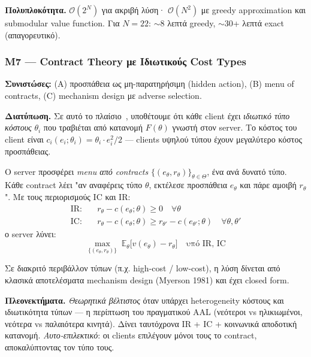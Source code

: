 \textbf{Πολυπλοκότητα.} $\mathcal{O}(2^N)$ για ακριβή λύση· $\mathcal{O}(N^2)$ με greedy
approximation και submodular value function. Για $N=22$: $\sim$8 λεπτά greedy, $\sim$30+ λεπτά
exact (απαγορευτικό).

\subsubsection{M7 — Contract Theory με Ιδιωτικούς Cost Types}
\label{subsubsec:M7_contract}

\textbf{Συνιστώσες:} (A) προσπάθεια ως μη-παρατηρήσιμη (hidden action), (B) menu of contracts, (C)
mechanism design με adverse selection.

\textbf{Διατύπωση.} Σε αυτό το πλαίσιο~\cite{Zhan2023}, υποθέτουμε ότι κάθε client έχει \emph{ιδιωτικό
τύπο κόστους} $\theta_i$ που τραβιέται από κατανομή $F(\theta)$ γνωστή στον server. Το κόστος του
client είναι $c_i(e_i; \theta_i) = \theta_i \cdot e_i^2 / 2$ — clients υψηλού τύπου έχουν μεγαλύτερο
κόστος προσπάθειας.

Ο server προσφέρει \emph{menu από contracts} $\{(e_\theta, r_\theta)\}_{\theta \in \Theta}$, ένα ανά
δυνατό τύπο. Κάθε contract λέει "αν αναφέρεις τύπο $\theta$, εκτέλεσε προσπάθεια $e_\theta$ και πάρε
αμοιβή $r_\theta$". Με τους περιορισμούς IC και IR:
\begin{align}
    \text{IR:} \quad & r_\theta - c(e_\theta; \theta) \geq 0 \quad \forall \theta \\
    \text{IC:} \quad & r_\theta - c(e_\theta; \theta) \geq r_{\theta'} - c(e_{\theta'}; \theta) \quad \forall \theta, \theta'
\end{align}
ο server λύνει:
\begin{equation}
    \max_{\{(e_\theta, r_\theta)\}} \; \mathbb{E}_\theta\big[v(e_\theta) - r_\theta\big]
    \quad \text{υπό IR, IC}
    \label{eq:M7_contract}
\end{equation}

Σε διακριτό περιβάλλον τύπων (π.χ. high-cost / low-cost), η λύση δίνεται από κλασικά αποτελέσματα
mechanism design (Myerson 1981) και έχει closed form.

\textbf{Πλεονεκτήματα.} \emph{Θεωρητικά βέλτιστος} όταν υπάρχει heterogeneity κόστους και ιδιωτικότητα
τύπων — η περίπτωση του πραγματικού AAL (νεότεροι vs ηλικιωμένοι, νεότερα vs παλαιότερα κινητά).
Δίνει ταυτόχρονα IR + IC + κοινωνικά αποδοτική κατανομή. \emph{Αυτο-επιλεκτικό}: οι clients επιλέγουν
μόνοι τους το contract, αποκαλύπτοντας τον τύπο τους.

